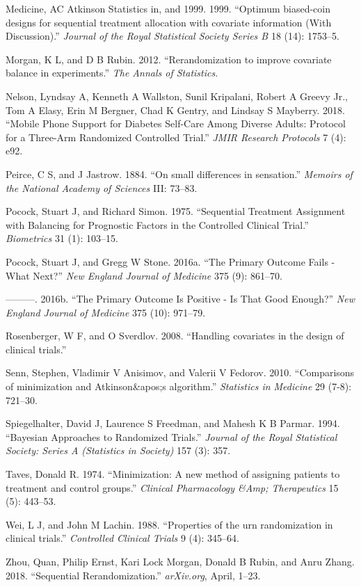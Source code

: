 \documentclass[12pt,oneside]{book}
\newlength{\li}\setlength{\li}{14.48pt}
\newlength{\di}\setlength{\di}{-3.5mm}
\theoremstyle{definition}
\theoremstyle{definition}
\theoremstyle{definition}
\theoremstyle{remark}
\begin{document}
\leavevmode\hypertarget{ref-Atkinson:1999hq}{}%
Medicine, AC Atkinson Statistics in, and 1999. 1999. ``Optimum
biased-coin designs for sequential treatment allocation with covariate
information (With Discussion).'' \emph{Journal of the Royal Statistical
Society Series B} 18 (14): 1753--5.

\leavevmode\hypertarget{ref-Morgan:2012iq}{}%
Morgan, K L, and D B Rubin. 2012. ``Rerandomization to improve covariate
balance in experiments.'' \emph{The Annals of Statistics}.

\leavevmode\hypertarget{ref-Nelson:2018bw}{}%
Nelson, Lyndsay A, Kenneth A Wallston, Sunil Kripalani, Robert A Greevy
Jr., Tom A Elasy, Erin M Bergner, Chad K Gentry, and Lindsay S Mayberry.
2018. ``Mobile Phone Support for Diabetes Self-Care Among Diverse
Adults: Protocol for a Three-Arm Randomized Controlled Trial.''
\emph{JMIR Research Protocols} 7 (4): e92.

\leavevmode\hypertarget{ref-Peirce:1884wra}{}%
Peirce, C S, and J Jastrow. 1884. ``On small differences in sensation.''
\emph{Memoirs of the National Academy of Sciences} III: 73--83.

\leavevmode\hypertarget{ref-Pocock:1975wd}{}%
Pocock, Stuart J, and Richard Simon. 1975. ``Sequential Treatment
Assignment with Balancing for Prognostic Factors in the Controlled
Clinical Trial.'' \emph{Biometrics} 31 (1): 103--15.

\leavevmode\hypertarget{ref-Pocock:2016ey}{}%
Pocock, Stuart J, and Gregg W Stone. 2016a. ``The Primary Outcome Fails
- What Next?'' \emph{New England Journal of Medicine} 375 (9): 861--70.

\leavevmode\hypertarget{ref-Pocock:2016ca}{}%
---------. 2016b. ``The Primary Outcome Is Positive - Is That Good
Enough?'' \emph{New England Journal of Medicine} 375 (10): 971--79.

\leavevmode\hypertarget{ref-Rosenberger:2008cm}{}%
Rosenberger, W F, and O Sverdlov. 2008. ``Handling covariates in the
design of clinical trials.''

\leavevmode\hypertarget{ref-Senn:2010bg}{}%
Senn, Stephen, Vladimir V Anisimov, and Valerii V Fedorov. 2010.
``Comparisons of minimization and Atkinson\&apos;s algorithm.''
\emph{Statistics in Medicine} 29 (7-8): 721--30.

\leavevmode\hypertarget{ref-Spiegelhalter:1994cn}{}%
Spiegelhalter, David J, Laurence S Freedman, and Mahesh K B Parmar.
1994. ``Bayesian Approaches to Randomized Trials.'' \emph{Journal of the
Royal Statistical Society: Series A (Statistics in Society)} 157 (3):
357.

\leavevmode\hypertarget{ref-Taves:1974hn}{}%
Taves, Donald R. 1974. ``Minimization: A new method of assigning
patients to treatment and control groups.'' \emph{Clinical Pharmacology
\&Amp; Therapeutics} 15 (5): 443--53.

\leavevmode\hypertarget{ref-Wei:1988if}{}%
Wei, L J, and John M Lachin. 1988. ``Properties of the urn randomization
in clinical trials.'' \emph{Controlled Clinical Trials} 9 (4): 345--64.

\leavevmode\hypertarget{ref-Quan:SeqRerand}{}%
Zhou, Quan, Philip Ernst, Kari Lock Morgan, Donald B Rubin, and Anru
Zhang. 2018. ``Sequential Rerandomization.'' \emph{arXiv.org}, April,
1--23.
\end{document}
